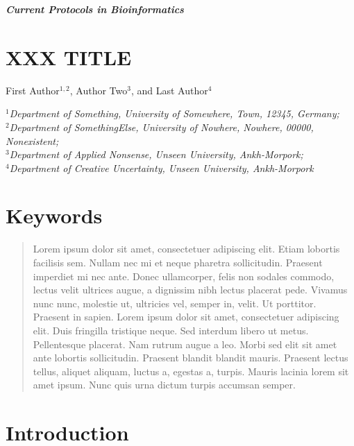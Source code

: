 
\thispagestyle{plain}
\begin{center}

\textbf{\LARGE \textit{Current Protocols in Bioinformatics}}\\\vspace{2mm}
\end{center}



\section*{XXX TITLE}

First Author$^{1,2}$, Author Two$^3$, and Last Author$^4$

{\small \it
$^1$Department of Something, University of Somewhere, Town, 12345, Germany;\\
$^2$Department of SomethingElse, University of Nowhere, Nowhere, 00000, Nonexistent;\\
$^3$Department of Applied Nonsense, Unseen University, Ankh-Morpork;\\
$^4$Department of Creative Uncertainty, Unseen University, Ankh-Morpork
}

\section*{Keywords}


\begin{abstract}
Lorem ipsum dolor sit amet, consectetuer adipiscing elit. Etiam lobortis facilisis sem. Nullam nec mi et neque pharetra sollicitudin. Praesent imperdiet mi nec ante. Donec ullamcorper, felis non sodales commodo, lectus velit ultrices augue, a dignissim nibh lectus placerat pede. Vivamus nunc nunc, molestie ut, ultricies vel, semper in, velit. Ut porttitor. Praesent in sapien. Lorem ipsum dolor sit amet, consectetuer adipiscing elit. Duis fringilla tristique neque. Sed interdum libero ut metus. Pellentesque placerat. Nam rutrum augue a leo. Morbi sed elit sit amet ante lobortis sollicitudin. Praesent blandit blandit mauris. Praesent lectus tellus, aliquet aliquam, luctus a, egestas a, turpis. Mauris lacinia lorem sit amet ipsum. Nunc quis urna dictum turpis accumsan semper.
\end{abstract}


\section*{Introduction}

